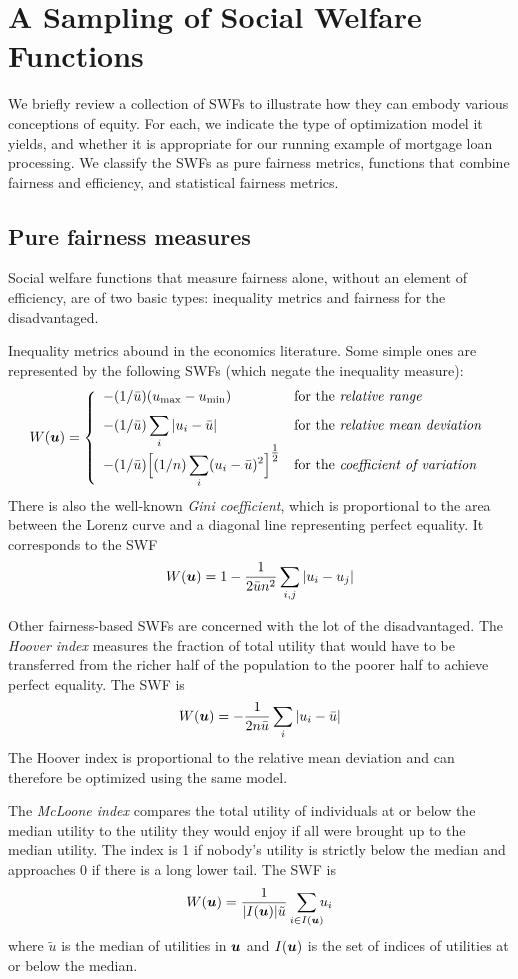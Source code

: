 \documentclass{article}[11pt]
\newcommand{\half}{{\textstyle\frac{1}{2}}}
\begin{document}
\section{A Sampling of Social Welfare Functions} \label{sec:swfdef}
We briefly review a collection of SWFs to illustrate how they can embody various conceptions of equity.  For each, we indicate the type of optimization model it yields, and whether it is appropriate for our running example of mortgage loan processing.  We classify the SWFs as pure fairness metrics, functions that combine fairness and efficiency, and statistical fairness metrics.

\subsection{Pure fairness measures}

Social welfare functions that measure fairness alone, without an element of efficiency, are of two basic types: inequality metrics and fairness for the disadvantaged.  

Inequality metrics abound in the economics literature.  Some simple ones are represented by the following SWFs (which negate the inequality measure): 
\[
W(\vu)=
\left\{
\begin{array}{ll}
{\ds -(1/\bar{u})(u_{\max}-u_{\min})} & \mbox{for the {\em relative range}} \vsp \vsp \vsp \\
{\ds -(1/\bar{u})\sum_i |u_i-\bar{u}|} & \mbox{for the {\em relative mean deviation}} \vspace{-0.5ex} \\
{\ds -(1/\bar{u})\Big[(1/n)\sum_i(u_i-\bar{u})^2\Big]^{\half}} & \mbox{for the {\em coefficient of variation}} 
\end{array}
\right.
\]
There is also the well-known {\em Gini coefficient}, which is proportional to the area between the Lorenz curve and a diagonal line representing perfect equality.  It corresponds to the SWF 
\[
W(\bm{u})= 1-\frac{1}{2\bar{u}n^2} \sum_{i,j} |u_i-u_j|
\]

Other fairness-based SWFs are concerned with the lot of the disadvantaged.  The {\em Hoover index} measures the fraction of total utility that would have to be transferred from the richer half of the population to the poorer half to achieve perfect equality. The SWF is
\[
W(\bm{u}) = -\frac{1}{2 n\bar{u}}\sum_i |u_i-\bar{u}|
\]
The Hoover index is proportional to the relative mean deviation and can therefore be optimized using the same model.

The {\em McLoone index} compares the total utility of individuals at or below the median utility to the utility they would enjoy if all were brought up to the median utility.  The index is 1 if nobody's utility is strictly below the median and approaches 0 if there is a long lower tail.  The SWF is 
\[
W(\bm{u}) = \frac{1}{|I(\bm{u})|\tilde{u}} \sum_{i\in I(\bm{u})} \hspace{-1ex}  u_i
\]
where $\tilde{u}$ is the median of utilities in $\bm{u}$ and $I(\bm{u})$ is the set of indices of utilities at or below the median.  
\end{document}
